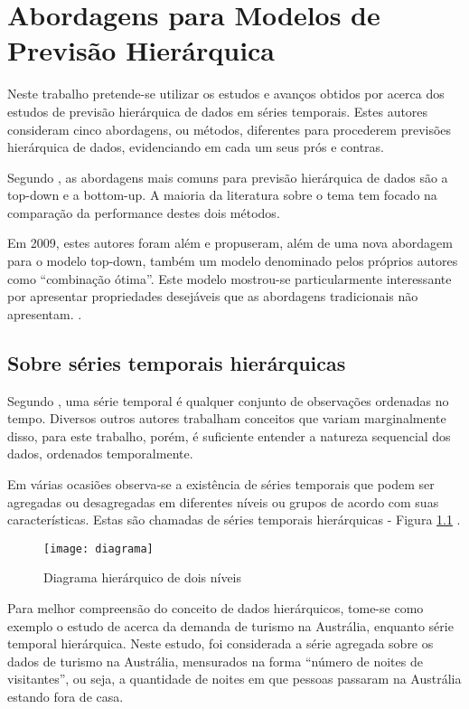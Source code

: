 \documentclass[
	12pt,				%
	openright,			%
	twoside,			%
	a4paper,			%
	english,			%
	french,				%
	spanish,			%
	brazil				%
	]{abntex2}
\begin{document}
\chapter{Abordagens para Modelos de Previsão Hierárquica}

Neste trabalho pretende-se utilizar os estudos e avanços obtidos por  acerca dos estudos de previsão hierárquica de dados em séries temporais.
Estes autores consideram cinco abordagens, ou métodos, diferentes para procederem previsões hierárquica de dados, evidenciando em cada um seus prós e contras.

Segundo , as abordagens mais comuns para previsão hierárquica de dados são a top-down e a bottom-up. A maioria da literatura sobre o tema tem focado na comparação da performance destes dois métodos.

Em 2009, estes autores foram além e propuseram, além de uma nova abordagem para o modelo top-down, também um modelo denominado pelos próprios autores como “combinação ótima”. Este modelo mostrou-se particularmente interessante por apresentar propriedades desejáveis que as abordagens tradicionais não apresentam. \cite{hyndman2009}. 

\section{Sobre séries temporais hierárquicas}

Segundo , uma série temporal é qualquer conjunto de observações ordenadas no tempo. Diversos outros autores trabalham conceitos que variam marginalmente disso, para este trabalho, porém, é suficiente entender a natureza sequencial dos dados, ordenados temporalmente.

Em várias ocasiões observa-se a existência de séries temporais que podem ser agregadas ou desagregadas em diferentes níveis ou grupos de acordo com suas características. Estas são chamadas de séries temporais hierárquicas \cite{hyndman2009} - Figura \ref{fig:diagrama} .

\begin{figure}[h]
\caption{\label{fig:diagrama} Diagrama hierárquico de dois níveis}
\centering
\texttt{[image: diagrama]}
\end{figure}

Para melhor compreensão do conceito de dados hierárquicos, tome-se como exemplo o estudo de  acerca da demanda de turismo na Austrália, enquanto série temporal hierárquica. Neste estudo, foi considerada a série agregada sobre os dados de turismo na Austrália, mensurados na forma “número de noites de visitantes”, ou seja, a quantidade de noites em que pessoas passaram na Austrália estando fora de casa. 
\end{document}
